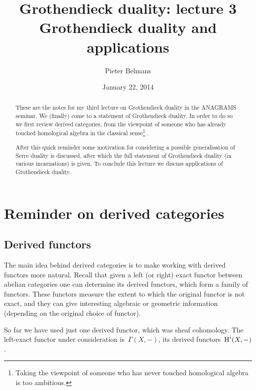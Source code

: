 \documentclass[10pt,a4paper]{article}
\title{Grothendieck duality: lecture 3 \\[.2em] \Large Grothendieck duality and applications}
\author{Pieter Belmans}
\date{January 22, 2014}
\begin{document}
\maketitle

\begin{abstract}
  These are the notes for my third lecture on Grothendieck duality in the ANAGRAMS seminar. We (finally) come to a statement of Grothendieck duality. In order to do so we first review derived categories, from the viewpoint of someone who has already touched homological algebra in the classical sense\footnote{Taking the viewpoint of someone who has never touched homological algebra is too ambitious.} \cite{weibel-homological-algebra}.

  After this quick reminder some motivation for considering a possible generalisation of Serre duality is discussed, after which the full statement of Grothendieck duality (in various incarnations) is given. To conclude this lecture we discuss applications of Grothendieck duality.
\end{abstract}

\tableofcontents

\clearpage

\setcounter{section}{-1}
\section{Reminder on derived categories}
\label{section:derived-categories}
\subsection{Derived functors}
The main idea behind derived categories is to make working with derived functors more natural. Recall that given a left (or right) exact functor between abelian categories one can determine its derived functors, which form a family of functors. These functors measure the extent to which the original functor is not exact, and they can give interesting algebraic or geometric information (depending on the original choice of functor).

\begin{example}
  So far we have used just one derived functor, which was sheaf cohomology. The left-exact functor under consideration is~$\Gamma(X,-)$, its derived functors~$\operatorname{H}^i(X,-)$.
\end{example}
\end{document}
